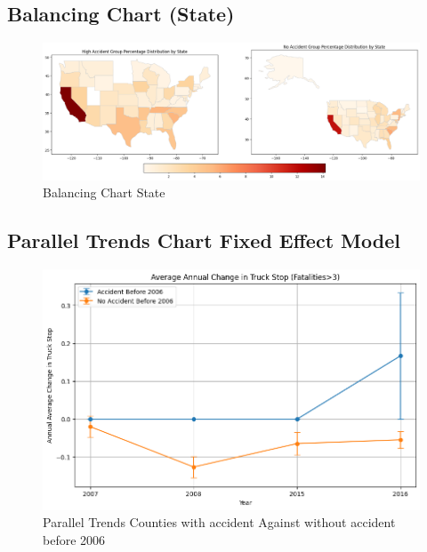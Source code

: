 \documentclass[
  12pt]{article}
\begin{document}
\subsection{Balancing Chart (State)}\label{sec-D.balancing_chart_state}

\begin{figure}[H]

{\centering \includegraphics{images/clipboard-2792065255.png}

}

\caption{Balancing Chart State}

\end{figure}%

\subsection{Parallel Trends Chart Fixed Effect
Model}\label{sec-parallel-trends-chart-fixed-effect-model}

\begin{figure}[H]

{\centering \includegraphics[width=4.6875in,height=\textheight]{images/output.png}

}

\caption{Parallel Trends Counties with accident Against without accident
before 2006}

\end{figure}%
\end{document}
